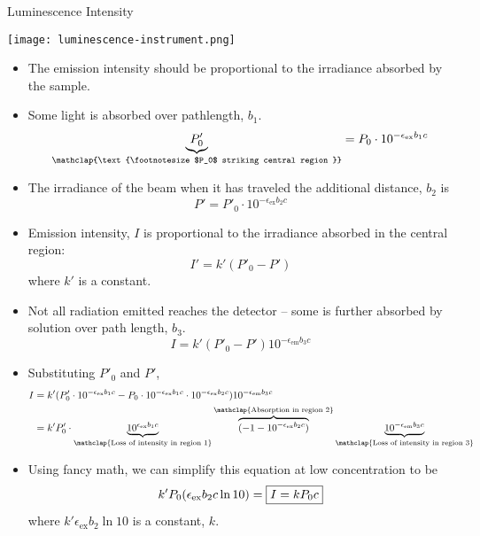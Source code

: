 \documentclass[notes=only]{beamer}
\begin{document}
\begin{frame}{Luminescence Intensity}
	\begin{center}
		\texttt{[image: luminescence-instrument.png]}
	\end{center}
	
	\begin{itemize}[<only@+>]
		\item The emission intensity should be proportional to the
			irradiance absorbed by the sample.
		\item Some light is absorbed over pathlength, $b_1$.
			\begin{equation*}
				\underbrace{P'_0}_{\mathclap{\text{\footnotesize
				$P_0$ striking central region
				}}} = P_0 \cdot
				10^{-\epsilon_\text{ex}b_1c}
			\end{equation*}
		\item The irradiance of the beam when it has traveled the
			additional distance, $b_2$ is
			\begin{equation*}
				P' = P'_0 \cdot
				10^{-\epsilon_\text{ex}b_2c}
			\end{equation*}
		\item Emission intensity, $I$ is proportional to the irradiance
			absorbed in the \alert{central region}:
			\begin{equation*}
				I' = k'(P'_0 - P')
			\end{equation*}
				where $k'$ is a constant.
		\item Not all radiation emitted reaches the detector -- some is
			further absorbed by solution over path length, $b_3$.
				\begin{equation*}
					I = k'(P'_0 -
					P')10^{-\epsilon_\text{em}b_3c}
				\end{equation*}
		\item Substituting $P'_0$ and $P'$,
			\begin{align*}
				I &= k'(P'_0 \cdot 10^{-\epsilon_\text{ex}b_1c} -
				P_0 \cdot 10^{-\epsilon_\text{ex}b_1c} \cdot
				10^{-\epsilon_\text{ex}b_2c})10^{-\epsilon_\text{em}b_3c}
				\\
				&= k'P'_0 \cdot
				\underbrace{10^{\epsilon_\text{ex}b_1c}}_{\mathclap{\text{Loss
				of intensity in region 1}}}
				\overbrace{(-1
				-10^{-\epsilon_\text{ex}b_2c})}^{\mathclap{\text{Absorption
				in region 2}}}
				\underbrace{10^{-\epsilon_\text{em}b_3c}}_{\mathclap{\text{Loss
				of intensity in region 3}}}
			\end{align*}
		\item Using fancy math, we can simplify this equation at
			\alert{low concentration} to be
			\begin{equation*}
				k'P_0(\epsilon_\text{ex}b_2c \ln 10) = \fbox{$I =
				kP_0c$}
			\end{equation*}
			where $k'\epsilon_\text{ex}b_2 \ln 10$ is a constant,
			$k$.
		\end{itemize}
\end{frame}
\end{document}
